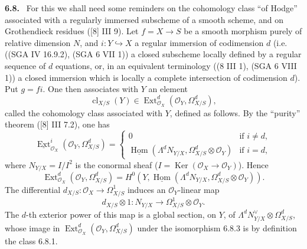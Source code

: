 \documentclass[11pt]{article}
\providecommand{\uExt}{\underline{\Ext}}
\newenvironment{statement}[1]{\par\medskip\noindent\textbf{#1.}\ }{\par\medskip}
\DeclareMathOperator{\Hom}{Hom}
\DeclareMathOperator{\Ext}{Ext}
\providecommand{\Ker}{\operatorname{Ker}}
\providecommand{\cl}{\operatorname{cl}}
\providecommand{\OO}{\mathcal O}
\begin{document}
\begin{statement}{6.8}
For this we shall need some reminders on the cohomology class ``of Hodge'' associated with a regularly immersed subscheme of a smooth scheme, and on Grothendieck residues ([8] III 9). Let $f=X\to S$ be a smooth morphism purely of relative dimension $N$, and $i:Y\hookrightarrow X$ a regular immersion of codimension $d$ (i.e. ((SGA IV 16.9.2), (SGA 6 VII 1)) a closed subscheme locally defined by a regular sequence of $d$ equations, or, in an equivalent terminology ((8 III 1), (SGA 6 VIII 1)) a closed immersion which is locally a complete intersection of codimension $d$). Put $g=fi$. One then associates with $Y$ an element
\begin{equation}
\tag{6.8.1}
\cl_{X/S}(Y)\in\Ext^d_{\OO_X}(\OO_Y,\Omega^d_{X/S}),
\end{equation}
called the cohomology class associated with $Y$, defined as follows. By the ``purity'' theorem ([8] III 7.2), one has
\begin{equation}
\tag{6.8.2}
\uExt^i_{\OO_X}(\OO_Y,\Omega^d_{X/S})=
\begin{cases}
0 & \text{if } i\ne d,\\
\underline{\Hom}(\Lambda^dN_{Y/X},\Omega^d_{X/S}\otimes\OO_Y) & \text{if } i=d,
\end{cases}
\end{equation}
where $N_{Y/X}=I/I^2$ is the conormal sheaf ($I=\Ker(\OO_X\to\OO_Y)$). Hence
\begin{equation}
\tag{6.8.3}
\Ext^d_{\OO_X}(\OO_Y,\Omega^d_{X/S})=H^0(Y,\underline{\Hom}(\Lambda^dN_{Y/X},\Omega^d_{X/S}\otimes\OO_Y)).
\end{equation}
The differential $d_{X/S}:\OO_X\to\Omega^1_{X/S}$ induces an $\OO_Y$-linear map
\[
d_{X/S}\otimes 1:N_{Y/X}\longrightarrow \Omega^1_{X/S}\otimes\OO_Y.
\]
The $d$-th exterior power of this map is a global section, on $Y$, of $\Lambda^dN^\vee_{Y/X}\otimes\Omega^d_{X/S}$, whose image in $\Ext^d_{\OO_X}(\OO_Y,\Omega^d_{X/S})$ under the isomorphism 6.8.3 is by definition the class 6.8.1.


\end{statement}
\end{document}
